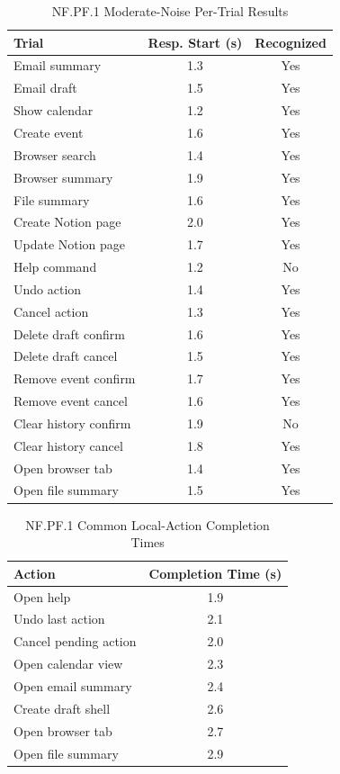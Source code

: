 \documentclass[12pt]{article}
\begin{document}
\begin{table}[htbp]
\centering
\caption{NF.PF.1 Moderate-Noise Per-Trial Results}
\label{tab:pf1-noise}
\begin{tabular}{>{\raggedright\arraybackslash}p{2.2cm}cc}
\toprule
\textbf{Trial} & \textbf{Resp. Start (s)} & \textbf{Recognized}\\
\midrule
Email summary & 1.3 & Yes\\
Email draft & 1.5 & Yes\\
Show calendar & 1.2 & Yes\\
Create event & 1.6 & Yes\\
Browser search & 1.4 & Yes\\
Browser summary & 1.9 & Yes\\
File summary & 1.6 & Yes\\
Create Notion page & 2.0 & Yes\\
Update Notion page & 1.7 & Yes\\
Help command & 1.2 & No\\
Undo action & 1.4 & Yes\\
Cancel action & 1.3 & Yes\\
Delete draft confirm & 1.6 & Yes\\
Delete draft cancel & 1.5 & Yes\\
Remove event confirm & 1.7 & Yes\\
Remove event cancel & 1.6 & Yes\\
Clear history confirm & 1.9 & No\\
Clear history cancel & 1.8 & Yes\\
Open browser tab & 1.4 & Yes\\
Open file summary & 1.5 & Yes\\
\bottomrule
\end{tabular}
\end{table}

\begin{table}[htbp]
\centering
\label{tab:pf1-completion}
\caption{NF.PF.1 Common Local-Action Completion Times}
\begin{tabular}{>{\raggedright\arraybackslash}p{3.1cm}c}
\toprule
\textbf{Action} & \textbf{Completion Time (s)}\\
\midrule
Open help & 1.9\\
Undo last action & 2.1\\
Cancel pending action & 2.0\\
Open calendar view & 2.3\\
Open email summary & 2.4\\
Create draft shell & 2.6\\
Open browser tab & 2.7\\
Open file summary & 2.9\\
\bottomrule
\end{tabular}
\end{table}
\end{document}

